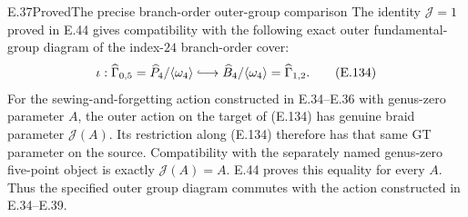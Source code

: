 \begin{result}{E.37}{Proved}{The precise branch-order outer-group comparison}
The identity $\mathcal J=1$ proved in E.44 gives
compatibility with the following exact outer
fundamental-group diagram of the index-$24$
branch-order cover:
\[
 \iota:\widehat\Gamma_{0,5}
       =\widehat P_4/\langle\omega_4\rangle
       \lhook\joinrel\longrightarrow
       \widehat B_4/\langle\omega_4\rangle
       =\widehat\Gamma_{1,2}.                          \tag{E.134}
\]
For the sewing-and-forgetting action constructed
in E.34--E.36 with genus-zero parameter $A$,
the outer action on the target of (E.134)
has genuine braid parameter $\mathcal J(A)$.
Its restriction along (E.134) therefore has
that same GT parameter on the source.
Compatibility with the separately named
genus-zero five-point object is exactly
$\mathcal J(A)=A$.
E.44 proves this equality for every $A$.
Thus the specified outer group diagram commutes
with the action constructed in E.34--E.39.
\end{result}
